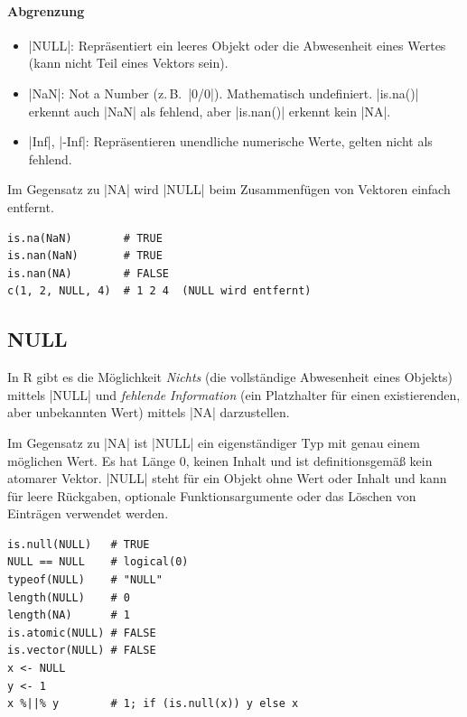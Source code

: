 \documentclass[10pt,twocolumn]{scrartcl}
\renewcommand{\lstinline}{\mycoloredinline}
\begin{document}
\paragraph{Abgrenzung}
\begin{itemize}
  \item \lstinline|NULL|: Repräsentiert ein leeres Objekt oder die Abwesenheit eines Wertes (kann nicht Teil eines Vektors sein).
  \item \lstinline|NaN|: Not a Number (z.\,B.\ \lstinline|0/0|). Mathematisch undefiniert. \lstinline|is.na()| erkennt auch \lstinline|NaN| als fehlend, aber \lstinline|is.nan()| erkennt kein \lstinline|NA|.
  \item \lstinline|Inf|, \lstinline|-Inf|: Repräsentieren unendliche numerische Werte, gelten nicht als fehlend.
\end{itemize}

Im Gegensatz zu \lstinline|NA| wird \lstinline|NULL| beim Zusammenfügen von Vektoren einfach entfernt.

\begin{lstlisting}
is.na(NaN)        # TRUE
is.nan(NaN)       # TRUE
is.nan(NA)        # FALSE
c(1, 2, NULL, 4)  # 1 2 4  (NULL wird entfernt)
\end{lstlisting}


\subsection{NULL}

In R gibt es die Möglichkeit \emph{Nichts} (die vollständige Abwesenheit eines Objekts) mittels \lstinline|NULL| und \emph{fehlende Information} (ein Platzhalter für einen existierenden, aber unbekannten Wert) mittels \lstinline|NA| darzustellen.

Im Gegensatz zu \lstinline|NA| ist \lstinline|NULL| ein eigenständiger Typ mit genau einem möglichen Wert. Es hat Länge 0, keinen Inhalt und ist definitionsgemäß kein atomarer Vektor. \lstinline|NULL| steht für ein Objekt ohne Wert oder Inhalt und kann für leere Rückgaben, optionale Funktionsargumente oder das Löschen von Einträgen verwendet werden.

\begin{lstlisting}
is.null(NULL)   # TRUE
NULL == NULL    # logical(0)
typeof(NULL)    # "NULL"
length(NULL)    # 0
length(NA)      # 1
is.atomic(NULL) # FALSE
is.vector(NULL) # FALSE
x <- NULL
y <- 1
x %||% y        # 1; if (is.null(x)) y else x
\end{lstlisting}
\end{document}
